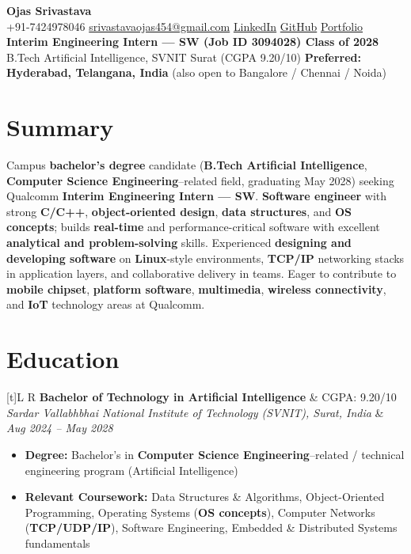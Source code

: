 \documentclass[a4paper,10pt]{article}
\newcommand{\resumeSubheading}[4]{%
  \vspace{0.5mm}
  \noindent
  \begin{tabularx}{\textwidth}[t]{L R}
    \textbf{#1} & #4 \\
    \textit{#3} & \textit{#2} \\
  \end{tabularx}
  \vspace{-0.5mm}%
}
\begin{document}
\selectfont

\begin{center}
  {\LARGE \textbf{Ojas Srivastava}} \\[1mm]
  \small
  +91-7424978046 \textbar{}
  \href{mailto:srivastavaojas454@gmail.com}{srivastavaojas454@gmail.com} \textbar{}
  \href{https://linkedin.com/in/ojas-srivastava05}{LinkedIn} \textbar{}
  \href{https://github.com/Ojas-Srivastava05}{GitHub} \textbar{}
  \href{https://ojas-srivastava.vercel.app}{Portfolio} \\[0.5mm]
  \textbf{Interim Engineering Intern --- SW (Job ID 3094028) \textbar{} Class of 2028} \\[0.3mm]
  B.Tech Artificial Intelligence, SVNIT Surat (CGPA 9.20/10) \textbar{}
  \textbf{Preferred: Hyderabad, Telangana, India} (also open to Bangalore / Chennai / Noida)
\end{center}

\vspace{-1mm}

\section{Summary}
\small
Campus \textbf{bachelor's degree} candidate (\textbf{B.Tech Artificial Intelligence}, \textbf{Computer Science Engineering}--related field, graduating May 2028) seeking Qualcomm \textbf{Interim Engineering Intern --- SW}. \textbf{Software engineer} with strong \textbf{C/C++}, \textbf{object-oriented design}, \textbf{data structures}, and \textbf{OS concepts}; builds \textbf{real-time} and performance-critical software with excellent \textbf{analytical and problem-solving} skills. Experienced \textbf{designing and developing software} on \textbf{Linux}-style environments, \textbf{TCP/IP} networking stacks in application layers, and collaborative delivery in teams. Eager to contribute to \textbf{mobile chipset}, \textbf{platform software}, \textbf{multimedia}, \textbf{wireless connectivity}, and \textbf{IoT} technology areas at Qualcomm.

\section{Education}
\small
\resumeSubheading
  {Bachelor of Technology in Artificial Intelligence}{Aug 2024 -- May 2028}
  {Sardar Vallabhbhai National Institute of Technology (SVNIT), Surat, India}{CGPA: 9.20/10}
\begin{itemize}
  \item \textbf{Degree:} Bachelor's in \textbf{Computer Science Engineering}--related / technical engineering program (Artificial Intelligence)
  \item \textbf{Relevant Coursework:} Data Structures \& Algorithms, Object-Oriented Programming, Operating Systems (\textbf{OS concepts}), Computer Networks (\textbf{TCP/UDP/IP}), Software Engineering, Embedded \& Distributed Systems fundamentals
\end{itemize}
\end{document}
